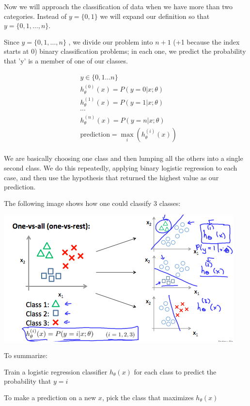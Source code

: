 \documentclass[10pt,a4paper,UTF8]{article}
\begin{document}
Now we will approach the classification of data when we have more than two categories. Instead of \(y=\{0,1\}\) we will expand our definition so that \(y=\{0,1,\ldots ,n\}\).

Since \(y= \{0,1,\ldots ,n\}\) , we divide our problem into \(n+1\) (+1 because the index starts at 0) binary classification problems; in each one, we predict the probability that 'y' is a member of one of our classes.

\begin{align*}& y \in \lbrace0, 1 ... n\rbrace \\& h_\theta^{(0)}(x) = P(y = 0 | x ; \theta) \\& h_\theta^{(1)}(x) = P(y = 1 | x ; \theta) \\& \cdots \\& h_\theta^{(n)}(x) = P(y = n | x ; \theta) \\& \mathrm{prediction} = \max_i( h_\theta ^{(i)}(x) )\\\end{align*}

We are basically choosing one class and then lumping all the others into a single second class. We do this repeatedly, applying binary logistic regression to each case, and then use the hypothesis that returned the highest value as our prediction.

The following image shows how one could classify 3 classes:

\begin{center}
\includegraphics[width=.9\linewidth]{../../img/computer_ng/20171009multiclass.png}
\end{center}

To summarize:

Train a logistic regression classifier \(h_{\theta}(x)\)  for each class  to predict the probability that \(y=i\)

To make a prediction on a new \(x\), pick the class that maximizes \(h_{\theta}(x)\)
\end{document}
